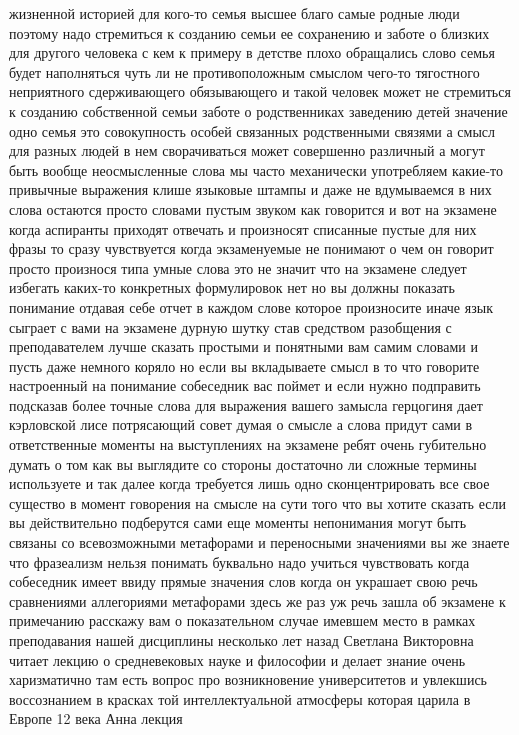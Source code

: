 жизненной историей для кого-то семья высшее благо самые родные люди поэтому надо
стремиться к созданию семьи ее сохранению и заботе о близких для другого
человека с кем к примеру в детстве плохо обращались слово семья будет
наполняться чуть ли не противоположным смыслом чего-то тягостного неприятного
сдерживающего обязывающего и такой человек может не стремиться к созданию
собственной семьи заботе о родственниках заведению детей значение одно семья это
совокупность особей связанных родственными связями а смысл для разных людей в
нем сворачиваться может совершенно различный а могут быть вообще неосмысленные
слова мы часто механически употребляем какие-то привычные выражения клише
языковые штампы и даже не вдумываемся в них слова остаются просто словами пустым
звуком как говорится и вот на экзамене когда аспиранты приходят отвечать и
произносят списанные пустые для них фразы то сразу чувствуется когда
экзаменуемые не понимают о чем он говорит просто произнося типа умные слова это
не значит что на экзамене следует избегать каких-то конкретных формулировок нет
но вы должны показать понимание отдавая себе отчет в каждом слове которое
произносите иначе язык сыграет с вами на экзамене дурную шутку став средством
разобщения с преподавателем лучше сказать простыми и понятными вам самим словами
и пусть даже немного коряло но если вы вкладываете смысл в то что говорите
настроенный на понимание собеседник вас поймет и если нужно подправить подсказав
более точные слова для выражения вашего замысла герцогиня дает кэрловской лисе
потрясающий совет думая о смысле а слова придут сами в ответственные моменты на
выступлениях на экзамене ребят очень губительно думать о том как вы выглядите со
стороны достаточно ли сложные термины используете и так далее когда требуется
лишь одно сконцентрировать все свое существо в момент говорения на смысле на
сути того что вы хотите сказать если вы действительно подберутся сами еще
моменты непонимания могут быть связаны со всевозможными метафорами и переносными
значениями вы же знаете что фразеализм нельзя понимать буквально надо учиться
чувствовать когда собеседник имеет ввиду прямые значения слов когда он украшает
свою речь сравнениями аллегориями метафорами здесь же раз уж речь зашла об
экзамене к примечанию расскажу вам о показательном случае имевшем место в рамках
преподавания нашей дисциплины несколько лет назад Светлана Викторовна читает
лекцию о средневековых науке и философии и делает знание очень харизматично там
есть вопрос про возникновение университетов и увлекшись воссознанием в красках
той интеллектуальной атмосферы которая царила в Европе 12 века Анна лекция
